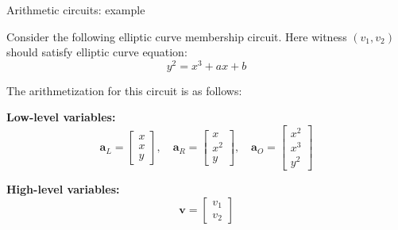 \documentclass{zkdl-presentation-template}
\begin{document}
\begin{frame}{Arithmetic circuits: example}
    \begin{example}
        Consider the following elliptic curve membership circuit. Here witness $(v_1, v_2)$ should satisfy elliptic curve equation:
        \begin{equation*}
            y^2 = x^3 + ax + b
        \end{equation*}

        The arithmetization for this circuit is as follows:

        \textbf{Low-level variables:}
        \begin{equation*}
            \mathbf{a}_L = \begin{bmatrix} x \\ x \\ y \end{bmatrix}, \quad 
            \mathbf{a}_R = \begin{bmatrix} x \\ x^2 \\ y \end{bmatrix}, \quad 
            \mathbf{a}_O = \begin{bmatrix} x^2\\x^3 \\ y^2 \end{bmatrix}
        \end{equation*}

        \textbf{High-level variables:}
        \begin{equation*}
            \mathbf{v} = \begin{bmatrix} v_1 \\ v_2 \end{bmatrix}
        \end{equation*}
    \end{example}
\end{frame}
\end{document}
